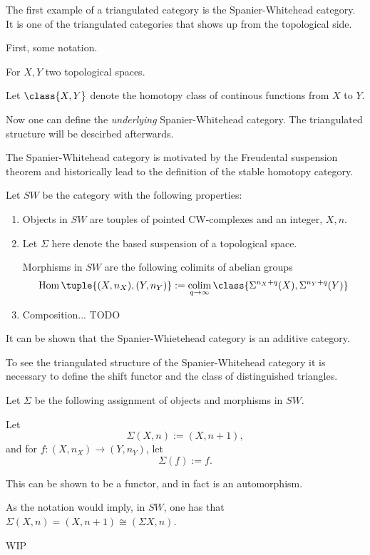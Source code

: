 The first example of a triangulated category is the Spanier-Whitehead category. It is one of the triangulated categories that shows up from the topological side.

First, some notation.
\begin{notation}
    For \( X, Y \) two topological spaces.

    Let \( \class{ X, Y } \) denote the homotopy class of continous functions from \( X \) to \( Y \).
\end{notation}

Now one can define the \emph{underlying} Spanier-Whitehead category. The triangulated structure will be descirbed afterwards.

The Spanier-Whitehead category is motivated by the Freudental suspension theorem and historically lead to the definition of the stable homotopy category.

\begin{definition}
    Let \( SW \) be the category with the following properties:
    \begin{enumerate}
        \item {
            Objects in \( SW \) are touples of pointed CW-complexes and an integer, \( X, n \).
        }
        \item {
            Let \( \Sigma \) here denote the based suspension of a topological space.

            Morphisms in \( SW \) are the following colimits of abelian groups
            \[
                \Hom\tuple{ (X, n_X), (Y, n_Y) } := \colim_{q \to \infty} \class{ \Sigma^{n_X + q}(X), \Sigma^{n_Y + q}(Y) }
            \]
        }
        \item {
            Composition... TODO
        }
    \end{enumerate}
\end{definition}

It can be shown that the Spanier-Whietehead category is an additive category.

To see the triangulated structure of the Spanier-Whitehead category it is necessary to define the shift functor and the class of distinguished triangles.

\begin{definition}
    Let \( \Sigma \) be the following assignment of objects and morphisms in \( SW \).

    Let
    \[
        \Sigma(X, n) := (X, n + 1),
    \] 
    and for \( f: (X, n_X) \to (Y, n_Y) \), let
    \[
        \Sigma(f) := f.
    \]

    This can be shown to be a functor, and in fact is an automorphism.
\end{definition}

As the notation would imply, in \( SW \), one has that \( \Sigma(X, n) = (X, n + 1) \cong ( \Sigma X, n ) \).

\begin{definition}
    WIP
\end{definition}
